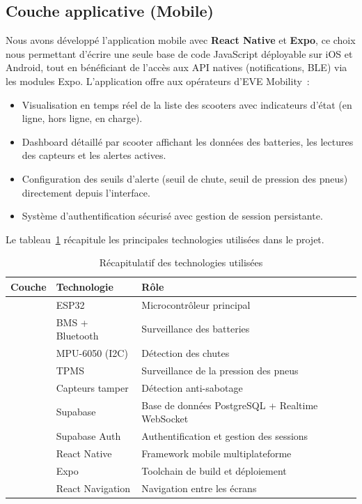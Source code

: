 \documentclass[12pt, a4paper]{report}
\begin{document}
\subsection{Couche applicative (Mobile)}

Nous avons développé l'application mobile avec \textbf{React Native} et \textbf{Expo},
ce choix nous permettant d'écrire une seule base de code JavaScript déployable sur
iOS et Android, tout en bénéficiant de l'accès aux API natives (notifications, BLE)
via les modules Expo. L'application offre aux opérateurs d'EVE Mobility~:

\begin{itemize}
  \item Visualisation en temps réel de la liste des scooters avec indicateurs
        d'état (en ligne, hors ligne, en charge).
  \item Dashboard détaillé par scooter affichant les données des batteries, les
        lectures des capteurs et les alertes actives.
  \item Configuration des seuils d'alerte (seuil de chute, seuil de pression
        des pneus) directement depuis l'interface.
  \item Système d'authentification sécurisé avec gestion de session persistante.
\end{itemize}

Le tableau~\ref{tab:technologies} récapitule les principales technologies utilisées
dans le projet.

\begin{table}[H]
  \centering
  \caption{Récapitulatif des technologies utilisées}
  \label{tab:technologies}
  \renewcommand{\arraystretch}{1.3}
  \begin{tabularx}{\textwidth}{>{\bfseries}p{2.5cm} p{3.5cm} X}
    \toprule
    \rowcolor{isimablue!20}
    \textbf{Couche} & \textbf{Technologie} & \textbf{Rôle} \\
    \midrule
    \multirow{5}{*}{Hardware}
               & ESP32              & Microcontrôleur principal \\
               & BMS + Bluetooth    & Surveillance des batteries \\
               & MPU-6050 (I2C)     & Détection des chutes \\
               & TPMS               & Surveillance de la pression des pneus \\
               & Capteurs tamper    & Détection anti-sabotage \\
    \midrule
    \multirow{2}{*}{Backend}
               & Supabase           & Base de données PostgreSQL + Realtime WebSocket \\
               & Supabase Auth      & Authentification et gestion des sessions \\
    \midrule
    \multirow{3}{*}{Mobile}
               & React Native       & Framework mobile multiplateforme \\
               & Expo               & Toolchain de build et déploiement \\
               & React Navigation   & Navigation entre les écrans \\
    \bottomrule
  \end{tabularx}
\end{table}
\end{document}
